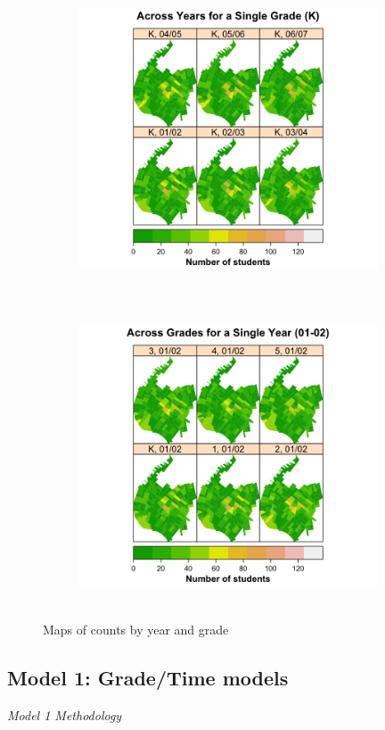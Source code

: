 \documentclass[journal]{IEEEtran}
\begin{document}
\begin{figure}
\centering
\begin{subfigure}
  \centering
  \includegraphics[width=3.5in,height=3.5in,clip,keepaspectratio]{year_map.png}
\end{subfigure}
\begin{subfigure}
  \centering
  \includegraphics[width=3.5in,height=3.5in,clip,keepaspectratio]{grade_map.png}
\end{subfigure}
\caption{Maps of counts by year and grade}
\label{fig:maps_grade_year}
\end{figure}

\subsection{Model 1: Grade/Time models}

\noindent\emph{Model 1 Methodology} \\
\end{document}
